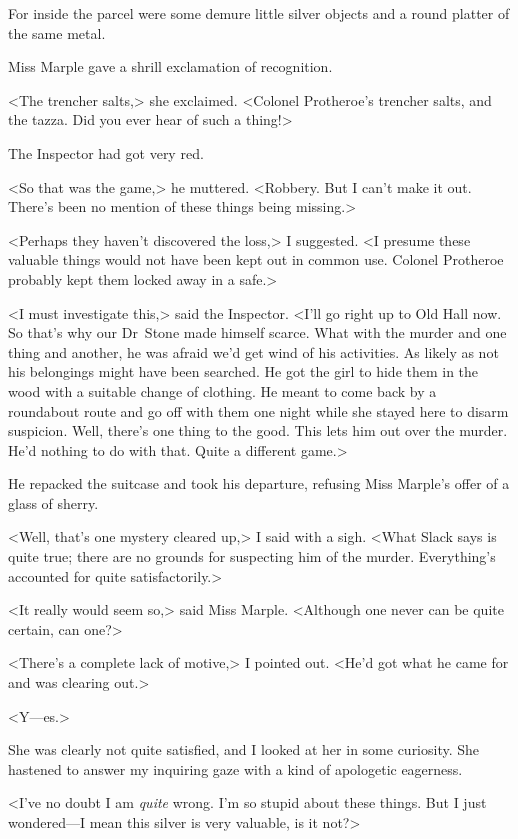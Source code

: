 For inside the parcel were some demure little silver objects and a round platter of the same metal.

Miss Marple gave a shrill exclamation of recognition.

<The trencher salts,> she exclaimed. <Colonel Protheroe's trencher salts, and the  tazza. Did you ever hear of such a thing!>

The Inspector had got very red.

<So that was the game,> he muttered. <Robbery. But I can't make it out. There's been no mention of these things being missing.>

<Perhaps they haven't discovered the loss,> I suggested. <I presume these valuable things would not have been kept out in common use. Colonel Protheroe probably kept them locked away in a safe.>

<I must investigate this,> said the Inspector. <I'll go right up to Old Hall now. So that's why our Dr~Stone made himself scarce. What with the murder and one thing and another, he was afraid we'd get wind of his activities. As likely as not his belongings might have been searched. He got the girl to hide them in the wood with a suitable change of clothing. He meant to come back by a roundabout route and go off with them one night while she stayed here to disarm suspicion. Well, there's one thing to the good. This lets him out over the murder. He'd nothing to do with that. Quite a different game.>

He repacked the suitcase and took his departure, refusing Miss Marple's offer of a glass of sherry.

<Well, that's one mystery cleared up,> I said with a sigh. <What Slack says is quite true; there are no grounds for suspecting him of the murder. Everything's accounted for quite satisfactorily.>

<It really would seem so,> said Miss Marple. <Although one never can be quite certain, can one?>

<There's a complete lack of motive,> I pointed out. <He'd got what he came for and was clearing out.>

<Y—es.>

She was clearly not quite satisfied, and I looked at her in some curiosity. She hastened to answer my inquiring gaze with a kind of apologetic eagerness.

<I've no doubt I am \emph{quite} wrong. I'm so stupid about these things. But I just wondered—I mean this silver is very valuable, is it not?>

